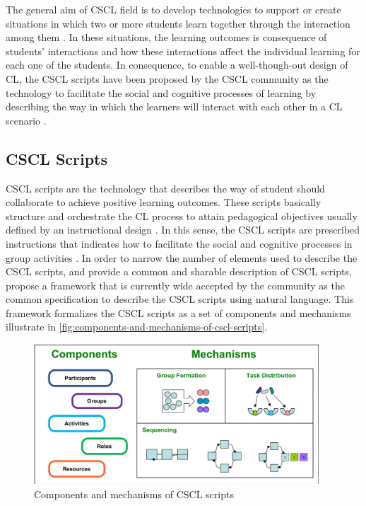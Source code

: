The general aim of CSCL field is to develop technologies to support or create situations in which two or more students learn together through the interaction among them \cite{Dillenbourg1999}.
In these situations, the learning outcomes is consequence of students' interactions and how these interactions affect the individual learning for each one of the students. In consequence, to enable a well-though-out design of CL, the CSCL scripts have been proposed by the CSCL community as the technology to facilitate the social and cognitive processes of learning by describing the way in which the learners will interact with each other in a CL scenario \cite{HarrerKobbeMalzahn2007}.

\subsection{CSCL Scripts}
\label{sec:cscl-scripts}

CSCL scripts are the technology that describes the way of student should collaborate to achieve positive learning outcomes.
These scripts basically structure and orchestrate the CL process to attain pedagogical objectives usually defined by an instructional design \cite{DillenbourgJermann2007}.
In this sense, the CSCL scripts are prescribed instructions that indicates how to facilitate the social and cognitive processes in group activities \cite{Dillenbourg2002}.
In order to narrow the number of elements used to describe the CSCL scripts, and provide a common and sharable description of CSCL scripts,  propose a framework that is currently wide accepted by the community as the common specification to describe the CSCL scripts using natural language.
This framework formalizes the CSCL scripts as a set of components and mechanisms illustrate in \autoref{fig:components-and-mechanisms-of-cscl-scripts}.


\begin{figure}[htb]
 \caption{Components and mechanisms of CSCL scripts}
 \label{fig:components-and-mechanisms-of-cscl-scripts}
 \centering
 \includegraphics[width=0.95\textwidth]{images/chap-general-background/components-and-mechanisms-of-cscl-scripts}
\end{figure}

